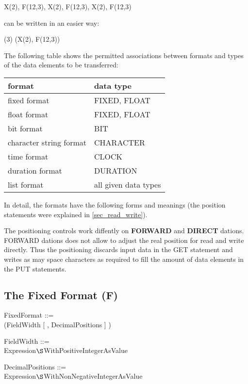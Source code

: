 X(2), F(12,3), X(2), F(12,3), X(2), F(12,3)

can be written in an easier way:

(3) (X(2), F(12,3))

The following table shows the permitted associations between formats and
types of the data elements to be transferred:

\begin{tabular}{ll}
format                  & data type \\ \hline
fixed format            & FIXED, FLOAT \\
float format            & FIXED, FLOAT \\
bit format              & BIT          \\
character string format & CHARACTER    \\
time format             & CLOCK        \\
duration format         & DURATION     \\
list format             & all given data types
\end{tabular}

In detail, the formats have the following forms and meanings (the
position statements were explained in \ref{sec_read_write}).

\begin{added}
The positioning controls work diffently on {\bf FORWARD} and {\bf DIRECT}
dations. FORWARD dations does not allow to adjust the real position for read
and write directly. 
Thus the positioning discards input data in the GET statement and 
writes as may space characters as required to fill the amount of data elements
in the PUT statements.
\end{added}


\subsection{The Fixed Format (F)}   %
\label{sec_dation_f_format}

FixedFormat ::=\\
 (FieldWidth [ , DecimalPositions \removedtext{[ , ScaleFactor ]} ] )

FieldWidth ::=\\
\x Expression$\S $WithPositiveIntegerAsValue

DecimalPositions ::=\\
\x Expression$\S $WithNonNegativeIntegerAsValue


